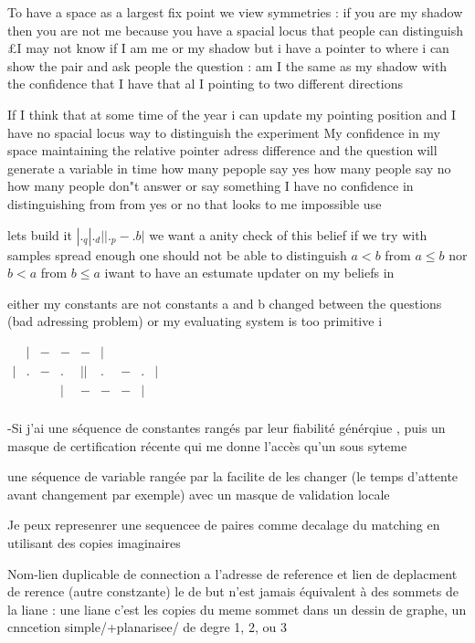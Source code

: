 \documentclass{article}
\begin{document}
 To have a space as a largest fix point we view symmetries : if you are my shadow then you are not me because you have a spacial locus that people
 can distinguish £I may not know if I am me or my shadow
 but i have a pointer to where i can show the pair and ask people  the question : am I the same as my shadow
 with the confidence that I have that al I pointing to two different directions
 
 If I think that at some time of the year i can update my pointing position and I have no spacial locus way  to distinguish the experiment
 My confidence in my space maintaining the relative pointer adress difference and the question will generate a variable in time 
 how many pepople say yes how many people say no how many people don"t answer or say something 
 I  have no confidence in distinguishing from from yes or no that looks to me impossible  use 
 
 lets build it $|._q | ._d || ._p- .b|$ we want a anity check  of this belief 
  if we try with samples spread enough one should not be able to distinguish
    $a<b$ from $a\le b$ nor $b<a$ from $b\le a$ iwant to have an estumate updater on my beliefs in 
    
    either my constants are not constants  a and b changed between the questions (bad adressing problem)
  or my evaluating system is too primitive  i
  
 $
 \begin{matrix} 
  &|&-&-&-&|&\\
 |&.&-&.&||&.&-&.&|\\
  & & &|&- &-&-&|\\
 \end{matrix}
  $        
  
  -Si j'ai une séquence de constantes rangés par leur fiabilité générqiue , puis un masque de certification récente qui me donne l'accès qu'un sous syteme
  
  une séquence de variable rangée par la facilite de les changer (le temps d'attente avant changement par exemple)
  avec un masque de validation locale
  
  Je peux represenrer une sequencee de paires comme decalage du matching en utilisant des copies imaginaires
  
  Nom-lien duplicable de connection a l'adresse de reference et lien de deplacment de rerence (autre constzante) le de but n'est jamais équivalent  à des sommets de la liane : une liane c'est les copies du meme sommet dans un dessin de graphe, un cnncetion simple/+planarisee/ de degre 1, 2, ou 3 
\end{document}

